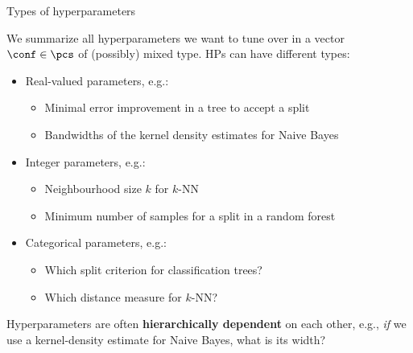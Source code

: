 \begin{frame}{Types of hyperparameters}

We summarize all hyperparameters we want to tune over in a vector $\conf \in \pcs$ of (possibly) mixed type. HPs can have different types:

\begin{itemize}
\item Real-valued parameters, e.g.:
\begin{itemize}
\item Minimal error improvement in a tree to accept a split
\item Bandwidths of the kernel density estimates for Naive Bayes
\end{itemize}
\item Integer parameters, e.g.:
\begin{itemize}
\item Neighbourhood size $k$ for $k$-NN
\item Minimum number of samples for a split in a random forest
\end{itemize}
\item Categorical parameters, e.g.:
\begin{itemize}
\item Which split criterion for classification trees?
\item Which distance measure for $k$-NN?
\end{itemize}
\end{itemize}

Hyperparameters are often \textbf{hierarchically dependent} on each other, e.g., \emph{if} we use
a kernel-density estimate for Naive Bayes, what is its width?
\end{frame}


